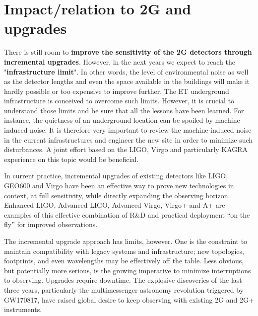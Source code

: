 \section{Impact/relation to 2G and upgrades}

There is still room to \textbf{improve the sensitivity of the 2G detectors through incremental upgrades}. However, in the next years we expect to reach the "\textbf{infrastructure limit}". In other words, the level of environmental noise as well as the detector lengths and even the space available in the buildings will make it hardly possible or too expensive to improve further. The ET underground infrastructure is conceived to overcome such limits.   However, it is crucial to understand those limits and be sure that all the lessons have been learned. For instance, the quietness of an underground location can be spoiled by machine-induced noise. It is therefore very important to review the machine-induced noise in the current infrastructures and engineer the new site in order to minimize such disturbances. A joint effort based on the LIGO, Virgo and particularly KAGRA experience on this topic would be beneficial. 

In current practice, incremental upgrades of existing detectors like LIGO, GEO600  and Virgo have been an effective way to prove new technologies in context, at full sensitivity, while directly expanding the observing horizon. Enhanced LIGO, Advanced LIGO, Advanced Virgo, Virgo+ and A+ are examples of this effective combination of R\&D and practical deployment ``on the fly''  for improved observations.  

The incremental upgrade approach has limits, however.  One is the constraint to maintain compatibility with legacy systems and infrastructure; new topologies, footprints, and even wavelengths may be effectively off the table. Less obvious, but potentially more serious, is the growing imperative to minimize interruptions to observing. Upgrades require downtime.  The explosive discoveries of the last three years, particularly the multimessenger astronomy revolution triggered by GW170817,  have raised global desire to keep observing with existing 2G and 2G+ instruments. 

